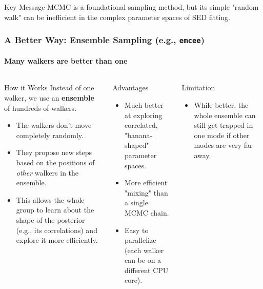 \documentclass[aspectratio=169]{beamer}
\newcommand{\keyterm}[1]{\textbf{\textcolor{blue!70!black}{#1}}}
\begin{document}
\begin{frame}
    \begin{alertblock}{Key Message}
        MCMC is a foundational sampling method, but its simple "random walk" can be inefficient in the complex parameter spaces of SED fitting.
    \end{alertblock}
\end{frame}

\begin{frame}
    \frametitle{A Better Way: Ensemble Sampling (e.g., \texttt{emcee})}
    \framesubtitle{Many walkers are better than one}
    
    \begin{columns}[T]
        \begin{block}{How it Works}
            Instead of one walker, we use an \keyterm{ensemble} of hundreds of walkers.
            \begin{itemize}
                \item The walkers don't move completely randomly.
                \item They propose new steps based on the positions of \textit{other} walkers in the ensemble.
                \item This allows the whole group to learn about the shape of the posterior (e.g., its correlations) and explore it more efficiently.
            \end{itemize}
        \end{block}
        
        \begin{block}{Advantages}
            \begin{itemize}
                \item Much better at exploring correlated, "banana-shaped" parameter spaces.
                \item More efficient "mixing" than a single MCMC chain.
                \item Easy to parallelize (each walker can be on a different CPU core).
            \end{itemize}
        \end{block}
        
        \begin{block}{Limitation}
            \begin{itemize}
                \item While better, the whole ensemble can still get trapped in one mode if other modes are very far away.
            \end{itemize}
        \end{block}
        

\end{columns}
\end{frame}
\end{document}
